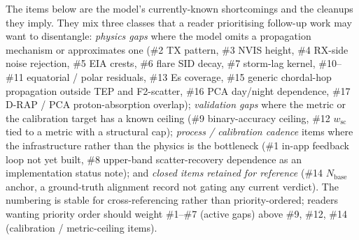 \documentclass[11pt,a4paper]{article}
\begin{document}
The items below are the model's currently-known shortcomings and
the cleanups they imply.  They mix three classes that a reader
prioritising follow-up work may want to disentangle:
\emph{physics gaps} where the model omits a propagation mechanism
or approximates one (\#2 TX pattern, \#3 NVIS height, \#4 RX-side
noise rejection, \#5 EIA crests, \#6 flare SID decay, \#7
storm-lag kernel, \#10--\#11 equatorial / polar residuals, \#13
Es coverage, \#15 generic chordal-hop propagation outside TEP
and F2-scatter, \#16 PCA day/night dependence, \#17 D-RAP /
PCA proton-absorption overlap);
\emph{validation gaps} where the metric or the calibration target
has a known ceiling (\#9 binary-accuracy ceiling, \#12
$w_{\text{sc}}$ tied to a metric with a structural cap);
\emph{process / calibration cadence} items where the
infrastructure rather than the physics is the bottleneck
(\#1 in-app feedback loop not yet built, \#8 upper-band
scatter-recovery dependence as an implementation status note);
and \emph{closed items retained for reference}
(\#14 $N_{\text{base}}$ anchor,
a ground-truth alignment record not gating any current verdict).
The numbering is stable for cross-referencing rather than
priority-ordered; readers wanting priority order should weight
\#1--\#7 (active gaps) above \#9, \#12, \#14 (calibration /
metric-ceiling items).
\end{document}
